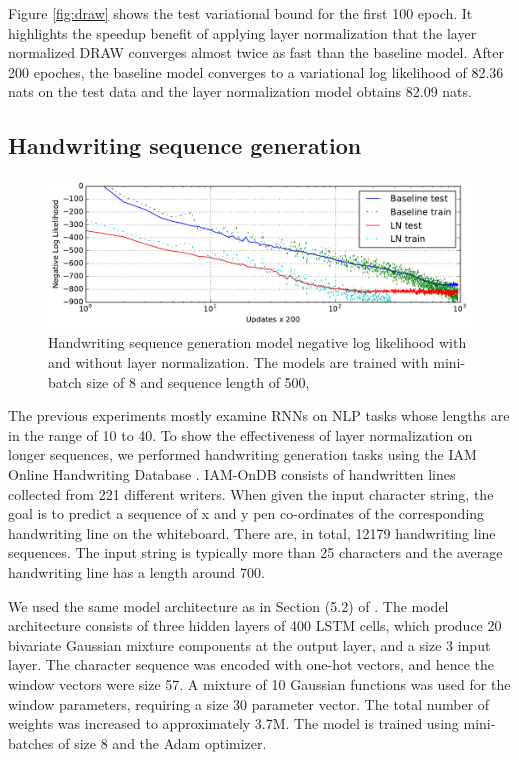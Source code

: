 \documentclass{article}
\begin{document}
Figure \ref{fig:draw} shows the test variational bound for the first 100 epoch. It highlights the speedup benefit of applying layer normalization that the layer normalized DRAW converges
almost twice as fast than the baseline model. After 200 epoches, the baseline model converges
to a variational log likelihood of 82.36 nats  on the test data and
the layer normalization model obtains 82.09 nats.

\subsection{Handwriting sequence generation}

\begin{figure}
  \vspace{-0.3in}
  \centering
\includegraphics[width=0.9\columnwidth]{figures/seqgen_ex.pdf}  
\caption{Handwriting sequence generation model negative log likelihood with and without layer normalization. The models are trained with mini-batch size of 8 and sequence length of 500,
\vspace{-0.15in}
}
\label{fig:seqgen}
\vspace{-0.05in}
\end{figure}
The previous experiments mostly examine RNNs on NLP tasks whose lengths are in the range of 10 to 40. To show the effectiveness of layer normalization on longer sequences, we performed handwriting generation tasks using the IAM Online Handwriting Database \citep{liwicki2005iam}. IAM-OnDB consists of handwritten lines collected from 221 different writers. When given the input character string, the goal is to predict a sequence of x and y pen co-ordinates of the corresponding handwriting line on the whiteboard. There are, in total, 12179 handwriting line sequences. The input string is typically more than 25 characters and the average handwriting line has a length around 700.  

We used the same model architecture as in Section (5.2) of \citet{graves2013generating}. The model architecture consists of three hidden layers
of 400 LSTM cells, which produce 20 bivariate Gaussian mixture components at the output layer, and a size 3 input layer. The character sequence was encoded with one-hot vectors, and hence the window vectors were size 57. A mixture of 10 Gaussian functions was used for the window parameters, requiring a size 30 parameter vector. The total number of weights was increased to approximately 3.7M. The model is trained using mini-batches of size 8 and the Adam \citep{adam} optimizer.
\end{document}
